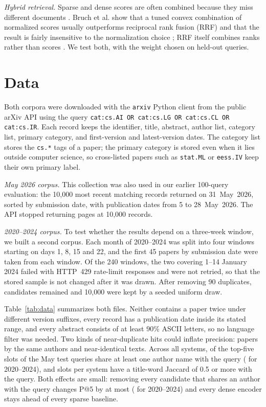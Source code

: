 \documentclass[conference]{IEEEtran}
\begin{document}
\textit{Hybrid retrieval.} Sparse and dense scores are often combined because they miss different documents \cite{luan2021sparse}. Bruch et al. show that a tuned convex combination of normalized scores usually outperforms reciprocal rank fusion (RRF) and that the result is fairly insensitive to the normalization choice \cite{bruch2022fusion}; RRF itself combines ranks rather than scores \cite{cormack2009rrf}. We test both, with the weight chosen on held-out queries.

\section{Data}
\label{sec:data}

Both corpora were downloaded with the \texttt{arxiv} Python client from the public arXiv API using the query \texttt{cat:cs.AI OR cat:cs.LG OR cat:cs.CL OR cat:cs.IR}. Each record keeps the identifier, title, abstract, author list, category list, primary category, and first-version and latest-version dates. The category list stores the \texttt{cs.*} tags of a paper; the primary category is stored even when it lies outside computer science, so cross-listed papers such as \texttt{stat.ML} or \texttt{eess.IV} keep their own primary label.

\textit{May 2026 corpus.} This collection was also used in our earlier 100-query evaluation: the 10{,}000 most recent matching records returned on 31~May~2026, sorted by submission date, with publication dates from 5 to 28~May~2026. The API stopped returning pages at 10{,}000 records.

\textit{2020--2024 corpus.} To test whether the results depend on a three-week window, we built a second corpus. Each month of 2020--2024 was split into four windows starting on days 1, 8, 15 and 22, and the first 45 papers by submission date were taken from each window. Of the 240 windows, the two covering 1--14 January 2024 failed with HTTP~429 rate-limit responses and were not retried, so that the stored sample is not changed after it was drawn. After removing 90 duplicates,  candidates remained and 10{,}000 were kept by a seeded uniform draw.

Table~\ref{tab:data} summarizes both files. Neither contains a paper twice under different version suffixes, every record has a publication date inside its stated range, and every abstract consists of at least 90\% ASCII letters, so no language filter was needed. Two kinds of near-duplicate hits could inflate precision: papers by the same authors and near-identical texts. Across all systems,  of the  top-five slots of the May test queries share at least one author name with the query ( for 2020--2024), and  slots per system have a title-word Jaccard of 0.5 or more with the query. Both effects are small: removing every candidate that shares an author with the query changes P@5 by at most  ( for 2020--2024) and every dense encoder stays ahead of every sparse baseline.
\end{document}
